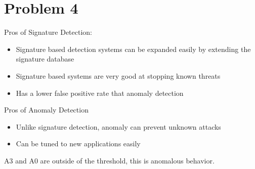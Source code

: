 \documentclass{article}
\newenvironment{problem}[1]{
  \nobreak\section*{Problem #1}
}{}
\begin{document}
  \begin{problem}{4}
    Pros of Signature Detection:
    \begin{itemize}
      \item Signature based detection systems can be expanded easily by extending the signature database
      \item Signature based systems are very good at stopping known threats
      \item Has a lower false positive rate that anomaly detection
    \end{itemize}
    \noindent
    Pros of Anomaly Detection
    \begin{itemize}
      \item Unlike signature detection, anomaly can prevent unknown attacks
      \item Can be tuned to new applications easily
    \end{itemize}
    A3 and A0 are outside of the threshold, this is anomalous behavior.
  \end{problem}
\end{document}
